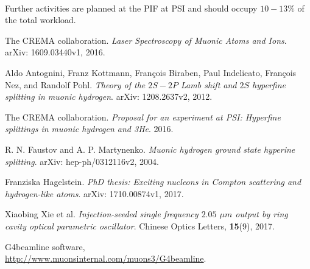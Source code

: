 \documentclass[12pt]{article}
\begin{document}
\paragraph{}
Further activities are planned at the PIF at PSI and should occupy $10-13 \%$ of the total workload.\\ 
\vspace{5.1pt}



\begin{thebibliography}{9}
The CREMA collaboration. \textit{Laser Spectroscopy of Muonic Atoms and Ions}. arXiv: 1609.03440v1, 2016.

Aldo Antognini, Franz Kottmann, Fran\c{c}ois Biraben, Paul Indelicato, Fran\c{c}ois Nez, and Randolf Pohl. \textit{Theory of the $2S-2P$ Lamb shift and $2S$ hyperfine splitting in muonic hydrogen}. arXiv: 1208.2637v2, 2012.

The CREMA collaboration. \textit{Proposal for an experiment at PSI: Hyperfine splittings in muonic hydrogen and 3He}. 2016.

R. N. Faustov and A. P. Martynenko. \textit{Muonic hydrogen ground state hyperine splitting}. arXiv: hep-ph/0312116v2, 2004.

Franziska Hagelstein. \textit{PhD thesis: Exciting nucleons in Compton scattering and hydrogen-like atoms}. arXiv: 1710.00874v1, 2017.

Xiaobing Xie et al. \textit{Injection-seeded single frequency $2.05$ ${\mu}m$ output by ring cavity optical parametric oscillator}. Chinese Optics Letters, \textbf{15}(9), 2017.

G4beamline software,\\
\url{http://www.muonsinternal.com/muons3/G4beamline}.



 
 
\end{thebibliography}
\end{document}
